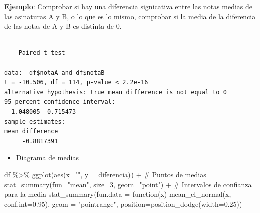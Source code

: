 \documentclass[
  a4paper,
]{scrreport}
\newenvironment{Shaded}{\begin{snugshade}}{\end{snugshade}}
\newcommand{\AttributeTok}[1]{\textcolor[rgb]{0.40,0.45,0.13}{#1}}
\newcommand{\CommentTok}[1]{\textcolor[rgb]{0.37,0.37,0.37}{#1}}
\newcommand{\ConstantTok}[1]{\textcolor[rgb]{0.56,0.35,0.01}{#1}}
\newcommand{\ControlFlowTok}[1]{\textcolor[rgb]{0.00,0.23,0.31}{#1}}
\newcommand{\DecValTok}[1]{\textcolor[rgb]{0.68,0.00,0.00}{#1}}
\newcommand{\FloatTok}[1]{\textcolor[rgb]{0.68,0.00,0.00}{#1}}
\newcommand{\FunctionTok}[1]{\textcolor[rgb]{0.28,0.35,0.67}{#1}}
\newcommand{\NormalTok}[1]{\textcolor[rgb]{0.00,0.23,0.31}{#1}}
\newcommand{\SpecialCharTok}[1]{\textcolor[rgb]{0.37,0.37,0.37}{#1}}
\newcommand{\StringTok}[1]{\textcolor[rgb]{0.13,0.47,0.30}{#1}}
\providecommand{\tightlist}{%
  \setlength{\itemsep}{0pt}\setlength{\parskip}{0pt}}\usepackage{longtable,booktabs,array}
\theoremstyle{definition}
\theoremstyle{definition}
\theoremstyle{remark}
\begin{document}
\textbf{Ejemplo}: Comprobar si hay una diferencia signicativa entre las
notas medias de las asinaturas A y B, o lo que es lo mismo, comprobar si
la media de la diferencia de las notas de A y B es distinta de 0.

\begin{Shaded}
\end{Shaded}

\begin{verbatim}

    Paired t-test

data:  df$notaA and df$notaB
t = -10.506, df = 114, p-value < 2.2e-16
alternative hypothesis: true mean difference is not equal to 0
95 percent confidence interval:
 -1.048005 -0.715473
sample estimates:
mean difference 
     -0.8817391 
\end{verbatim}

\begin{itemize}
\tightlist
\item
  Diagrama de medias
\end{itemize}

\begin{Shaded}
\begin{Highlighting}[]
\NormalTok{df }\SpecialCharTok{\%\textgreater{}\%} \FunctionTok{ggplot}\NormalTok{(}\FunctionTok{aes}\NormalTok{(}\AttributeTok{x=}\StringTok{""}\NormalTok{, }\AttributeTok{y =}\NormalTok{ diferencia)) }\SpecialCharTok{+} 
  \CommentTok{\# Puntos de medias}
  \FunctionTok{stat\_summary}\NormalTok{(}\AttributeTok{fun=}\StringTok{"mean"}\NormalTok{, }\AttributeTok{size=}\DecValTok{3}\NormalTok{,  }\AttributeTok{geom=}\StringTok{"point"}\NormalTok{) }\SpecialCharTok{+} 
  \CommentTok{\# Intervalos de confianza para la media}
  \FunctionTok{stat\_summary}\NormalTok{(}\AttributeTok{fun.data =} \ControlFlowTok{function}\NormalTok{(x) }\FunctionTok{mean\_cl\_normal}\NormalTok{(x, }\AttributeTok{conf.int=}\FloatTok{0.95}\NormalTok{), }\AttributeTok{geom =} \StringTok{"pointrange"}\NormalTok{, }\AttributeTok{position=}\FunctionTok{position\_dodge}\NormalTok{(}\AttributeTok{width=}\FloatTok{0.25}\NormalTok{)) }
\end{Highlighting}
\end{Shaded}
\end{document}
